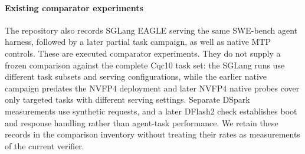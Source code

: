 \paragraph{Existing comparator experiments}
The repository also records SGLang EAGLE serving the same SWE-bench agent harness, followed by a later partial task campaign, as well as native MTP controls. These are executed comparator experiments. They do not supply a frozen comparison against the complete Cqc10 task set: the SGLang runs use different task subsets and serving configurations, while the earlier native campaign predates the NVFP4 deployment and later NVFP4 native probes cover only targeted tasks with different serving settings. Separate DSpark measurements use synthetic requests, and a later DFlash2 check establishes boot and response handling rather than agent-task performance. We retain these records in the comparison inventory without treating their rates as measurements of the current verifier.
